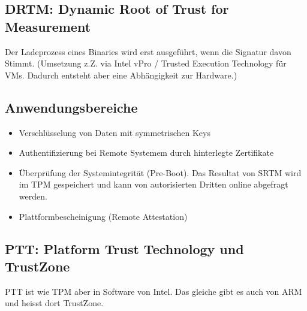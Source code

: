 


\subsection{DRTM: Dynamic Root of Trust for Measurement}
Der Ladeprozess eines Binaries wird erst ausgeführt, wenn die Signatur davon Stimmt. (Umsetzung z.Z. via Intel vPro / Trusted Execution Technology für VMs. Dadurch entsteht aber eine Abhängigkeit zur Hardware.)

\subsection{Anwendungsbereiche}
\begin{itemize}
	\item Verschlüsselung von Daten mit symmetrischen Keys
	\item Authentifizierung bei Remote Systemem durch hinterlegte Zertifikate 
	\item Überprüfung der Systemintegrität (Pre-Boot). Das Resultat von SRTM wird im TPM gespeichert und kann von autorisierten Dritten online abgefragt werden. 
	\item Plattformbescheinigung (Remote Attestation)
\end{itemize}

\subsection{PTT: Platform Trust Technology und TrustZone}
PTT ist wie TPM aber in Software von Intel. Das gleiche gibt es auch von ARM und heisst dort TrustZone.

